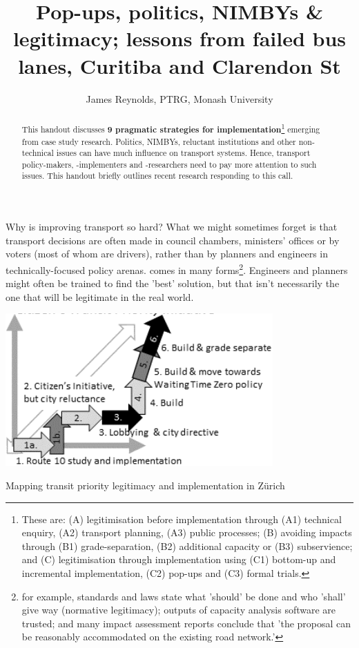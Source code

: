 \documentclass[nobib]{tufte-handout}
\title{Pop-ups, politics,  NIMBYs \& legitimacy; lessons from failed bus lanes, Curitiba and Clarendon St}
\author{James Reynolds, PTRG, Monash University}
\begin{document}
\maketitle%

\begin{abstract}
\noindent
This handout discusses \textbf{9 pragmatic strategies for implementation}\footnote{These are: (A) legitimisation before implementation through (A1) technical enquiry, (A2) transport planning, (A3) public processes; (B) avoiding impacts through (B1) grade-separation, (B2) additional capacity or (B3) subservience; and (C) legitimisation through implementation using (C1) bottom-up and incremental implementation, (C2) pop-ups and (C3) formal trials.} emerging from case study research. Politics, NIMBYs, reluctant institutions and other non-technical issues can have much influence on transport systems. Hence, transport policy-makers, -implementers and -researchers need to pay more attention to such issues\citep{Marsden:2017aa}. This handout briefly outlines recent research\citep{Reynolds:2020aa} responding to this call.  
\end{abstract}


Why is improving transport so hard? What we might sometimes forget is that transport decisions are often made in council chambers, ministers' offices or by voters (most of whom are drivers), rather than by planners and engineers in technically-focused policy arenas.   comes in many forms\footnote{for example, standards and laws state what 'should' be done and who 'shall' give way (normative legitimacy);  outputs of capacity analysis software are trusted; and many impact assessment reports conclude that 'the proposal can be reasonably accommodated on the existing road network.'}. Engineers and planners might often be trained to find the 'best' solution, but that isn't necessarily the one that will be legitimate in the real world.   



\begin{marginfigure}%
  \includegraphics[width=\linewidth]{Zurich}
  \caption{Mapping transit priority legitimacy and implementation in Zürich}
  \label{fig:Zurich}
\end{marginfigure}
\end{document}
